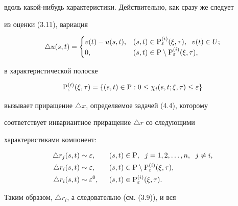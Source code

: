 вдоль какой-нибудь характеристики. Действительно, как сразу же следует


из оценки (3.11), вариация


\begin{equation}


\triangle u(s,t)=


\begin{cases}


v(t) - u(s,t),&  (s,t)\in {\P}_{\varepsilon}^{(i)} (\xi,\tau),


\ \; v(t) \in U; \\


0,& (s,t)\in {\P} \setminus {\P}_{\varepsilon}^{(i)} (\xi,\tau),


\end{cases}


\end{equation}


в характеристической полоске


\begin{equation}


{\P}_{\varepsilon}^{(i)} (\xi,\tau) = \{ (s,t) \in {\P}:


0 \leq \chi_{i} (s,t; \xi, \tau) \leq \varepsilon \}


\end{equation}


вызывает приращение $\triangle x$, определяемое задачей (4.4), которому


соответствует инвариантное приращение $\triangle r$ со следующими


характеристиками компонент:


\begin{alignat*}{2}


\triangle r_j (s,t) &\sim \varepsilon, &\ \; (s,t) &\in {\P},\ \;


j = 1,2,\dotsc,n,\ \; j \ne i, \\


\triangle r_i (s,t) &\sim \varepsilon, &\ \; (s,t) &\in {\P} \setminus 


{\P}_{\varepsilon}^{(i)} (\xi,\tau), \\


\triangle r_i (s,t) &\sim \varepsilon^{0}, &\ \; (s,t)


&\in {\P}_{\varepsilon}^{(i)} (\xi,\tau).


\end{alignat*}


Таким образом, $\triangle r_i$, а следовательно (см. (3.9)), и вся


